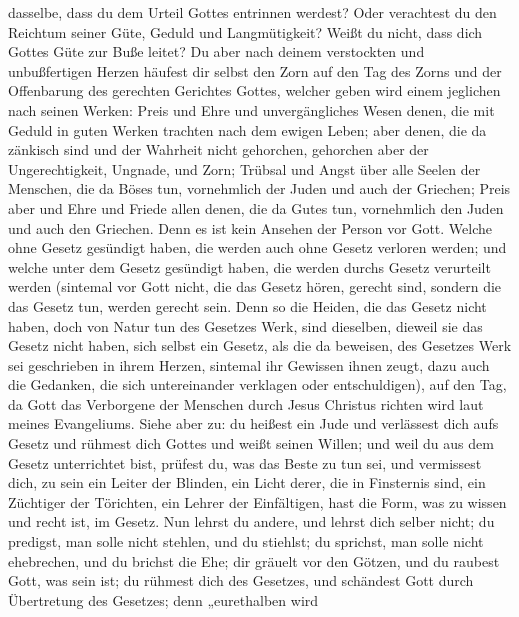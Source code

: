 dasselbe, dass du dem Urteil Gottes entrinnen werdest?  Oder
verachtest du den Reichtum seiner Güte, Geduld und Langmütigkeit? Weißt
du nicht, dass dich Gottes Güte zur Buße leitet?  Du aber
nach deinem verstockten und unbußfertigen Herzen häufest dir selbst den
Zorn auf den Tag des Zorns und der Offenbarung des gerechten Gerichtes
Gottes,  welcher geben wird einem jeglichen nach seinen
Werken:  Preis und Ehre und unvergängliches Wesen denen, die
mit Geduld in guten Werken trachten nach dem ewigen Leben; 
aber denen, die da zänkisch sind und der Wahrheit nicht gehorchen,
gehorchen aber der Ungerechtigkeit, Ungnade, und Zorn; 
Trübsal und Angst über alle Seelen der Menschen, die da Böses tun,
vornehmlich der Juden und auch der Griechen;  Preis aber
und Ehre und Friede allen denen, die da Gutes tun, vornehmlich den Juden
und auch den Griechen.  Denn es ist kein Ansehen der Person
vor Gott.  Welche ohne Gesetz gesündigt haben, die werden
auch ohne Gesetz verloren werden; und welche unter dem Gesetz gesündigt
haben, die werden durchs Gesetz verurteilt werden 
(sintemal vor Gott nicht, die das Gesetz hören, gerecht sind, sondern
die das Gesetz tun, werden gerecht sein.  Denn so die
Heiden, die das Gesetz nicht haben, doch von Natur tun des Gesetzes
Werk, sind dieselben, dieweil sie das Gesetz nicht haben, sich selbst
ein Gesetz,  als die da beweisen, des Gesetzes Werk sei
geschrieben in ihrem Herzen, sintemal ihr Gewissen ihnen zeugt, dazu
auch die Gedanken, die sich untereinander verklagen oder entschuldigen),
 auf den Tag, da Gott das Verborgene der Menschen durch
Jesus Christus richten wird laut meines Evangeliums.  Siehe
aber zu: du heißest ein Jude und verlässest dich aufs Gesetz und rühmest
dich Gottes  und weißt seinen Willen; und weil du aus dem
Gesetz unterrichtet bist, prüfest du, was das Beste zu tun sei,
 und vermissest dich, zu sein ein Leiter der Blinden, ein
Licht derer, die in Finsternis sind,  ein Züchtiger der
Törichten, ein Lehrer der Einfältigen, hast die Form, was zu wissen und
recht ist, im Gesetz.  Nun lehrst du andere, und lehrst
dich selber nicht; du predigst, man solle nicht stehlen, und du
stiehlst;  du sprichst, man solle nicht ehebrechen, und du
brichst die Ehe; dir gräuelt vor den Götzen, und du raubest Gott, was
sein ist;  du rühmest dich des Gesetzes, und schändest Gott
durch Übertretung des Gesetzes;  denn „eurethalben wird
